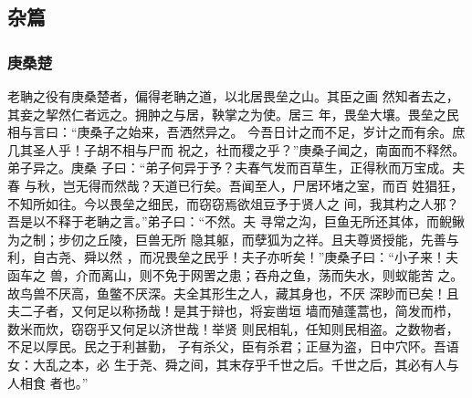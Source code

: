\documentclass[]{article}
\begin{document}
\hypertarget{header-n2286}{%
\subsection{杂篇}\label{header-n2286}}

\hypertarget{header-n2287}{%
\subsubsection{庚桑楚}\label{header-n2287}}

老聃之役有庚桑楚者，偏得老聃之道，以北居畏垒之山。其臣之画
然知者去之，其妾之挈然仁者远之。拥肿之与居，鞅掌之为使。居三
年，畏垒大壤。畏垒之民相与言曰：``庚桑子之始来，吾洒然异之。
今吾日计之而不足，岁计之而有余。庶几其圣人乎！子胡不相与尸而
祝之，社而稷之乎？''庚桑子闻之，南面而不释然。弟子异之。庚桑
子曰：``弟子何异于予？夫春气发而百草生，正得秋而万宝成。夫春
与秋，岂无得而然哉？天道已行矣。吾闻至人，尸居环堵之室，而百
姓猖狂，不知所如往。今以畏垒之细民，而窃窃焉欲俎豆予于贤人之
间，我其杓之人邪？吾是以不释于老聃之言。''弟子曰：``不然。夫
寻常之沟，巨鱼无所还其体，而鲵鳅为之制；步仞之丘陵，巨兽无所
隐其躯，而孽狐为之祥。且夫尊贤授能，先善与利，自古尧、舜以然
，而况畏垒之民乎！夫子亦听矣！''庚桑子曰：``小子来！夫函车之
兽，介而离山，则不免于网罟之患；吞舟之鱼，荡而失水，则蚁能苦
之。故鸟兽不厌高，鱼鳖不厌深。夫全其形生之人，藏其身也，不厌
深眇而已矣！且夫二子者，又何足以称扬哉！是其于辩也，将妄凿垣
墙而殖蓬蒿也，简发而栉，数米而炊，窃窃乎又何足以济世哉！举贤
则民相轧，任知则民相盗。之数物者，不足以厚民。民之于利甚勤，
子有杀父，臣有杀君；正昼为盗，日中穴阫。吾语女：大乱之本，必
生于尧、舜之间，其末存乎千世之后。千世之后，其必有人与人相食 者也。''
\end{document}
